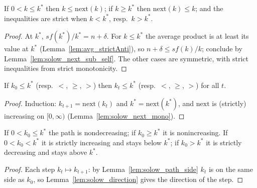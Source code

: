 \begin{lemma}
\label{lem:solow_direction}
\leanok
{}
If $0 < k \le k^*$ then $k \le \mathrm{next}(k)$; if $k \ge k^*$ then $\mathrm{next}(k) \le k$; and the
inequalities are strict when $k < k^*$, resp.\ $k > k^*$.
\end{lemma}
\begin{proof}
\leanok
At $k^*$, $s f(k^*)/k^* = n + \delta$. For $k \le k^*$ the average product is at least its value at $k^*$
(Lemma~\ref{lem:avg_strictAnti}), so $n + \delta \le s f(k)/k$; conclude by Lemma~\ref{lem:solow_next_sub_self}.
The other cases are symmetric, with strict inequalities from strict monotonicity.
\end{proof}

\begin{lemma}
\label{lem:solow_path_side}
\leanok
{}
If $k_0 \le k^*$ (resp.\ $<$, $\ge$, $>$) then $k_t \le k^*$ (resp.\ $<$, $\ge$, $>$) for all $t$.
\end{lemma}
\begin{proof}
\leanok
Induction: $k_{t+1} = \mathrm{next}(k_t)$ and $k^* = \mathrm{next}(k^*)$, and $\mathrm{next}$ is (strictly)
increasing on $[0, \infty)$ (Lemma~\ref{lem:solow_next_mono}).
\end{proof}

\begin{theorem}
\label{thm:solow_monotone_paths}
\leanok
{}
If $0 < k_0 \le k^*$ the path is nondecreasing; if $k_0 \ge k^*$ it is nonincreasing. If $0 < k_0 < k^*$ it
is strictly increasing and stays below $k^*$; if $k_0 > k^*$ it is strictly decreasing and stays above $k^*$.
\end{theorem}
\begin{proof}
\leanok
Each step $k_t \mapsto k_{t+1}$: by Lemma~\ref{lem:solow_path_side} $k_t$ is on the same side as $k_0$, so
Lemma~\ref{lem:solow_direction} gives the direction of the step.
\end{proof}

